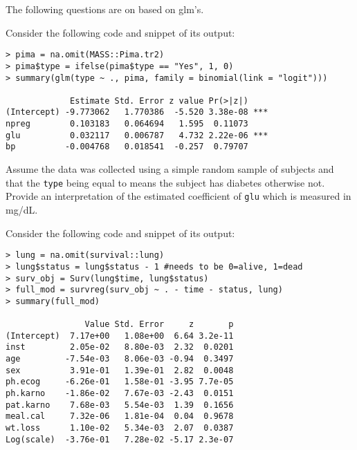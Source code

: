 \documentclass[12pt]{article}
\begin{document}
\vspace{-0.5cm}
\problem The following questions are on based on glm's.


\begin{enumerate}[(a)]

 Consider the following code and snippet of its output:

\begin{Verbatim}[frame=single]
> pima = na.omit(MASS::Pima.tr2)
> pima$type = ifelse(pima$type == "Yes", 1, 0)
> summary(glm(type ~ ., pima, family = binomial(link = "logit")))

             Estimate Std. Error z value Pr(>|z|)    
(Intercept) -9.773062   1.770386  -5.520 3.38e-08 ***
npreg        0.103183   0.064694   1.595  0.11073    
glu          0.032117   0.006787   4.732 2.22e-06 ***
bp          -0.004768   0.018541  -0.257  0.79707    
\end{Verbatim}

Assume the data was collected using a simple random sample of subjects and that the \texttt{type} being equal to  means the subject has diabetes otherwise not. Provide an interpretation of the estimated coefficient of \texttt{glu} which is measured in mg/dL.

\iftoggle{solutions}{\inred{
When comparing two subjects (A) and (B) which are sampled in the same fashion as the other subjects in this dataset where (A) has a \texttt{glu} measurement 1mg/dL larger than (B)'s \texttt{glu} measurement but share the same other observed measurements otherwise, then (A) is predicted to have an estimated log odds probability of diabetes 0.032 $\pm$ 0.007 higher than (B)'s log odds probability of diabetes assuming the log odds probability of diabetes is linear in the measurements considered herein.
}}{~\spc{3}}
\pagebreak

 Consider the following code and snippet of its output:

\begin{Verbatim}[frame=single]
> lung = na.omit(survival::lung)
> lung$status = lung$status - 1 #needs to be 0=alive, 1=dead
> surv_obj = Surv(lung$time, lung$status)
> full_mod = survreg(surv_obj ~ . - time - status, lung)
> summary(full_mod)

                Value Std. Error     z       p
(Intercept)  7.17e+00   1.08e+00  6.64 3.2e-11
inst         2.05e-02   8.80e-03  2.32  0.0201
age         -7.54e-03   8.06e-03 -0.94  0.3497
sex          3.91e-01   1.39e-01  2.82  0.0048
ph.ecog     -6.26e-01   1.58e-01 -3.95 7.7e-05
ph.karno    -1.86e-02   7.67e-03 -2.43  0.0151
pat.karno    7.68e-03   5.54e-03  1.39  0.1656
meal.cal     7.32e-06   1.81e-04  0.04  0.9678
wt.loss      1.10e-02   5.34e-03  2.07  0.0387
Log(scale)  -3.76e-01   7.28e-02 -5.17 2.3e-07


\end{Verbatim}
\end{enumerate}
\end{document}
